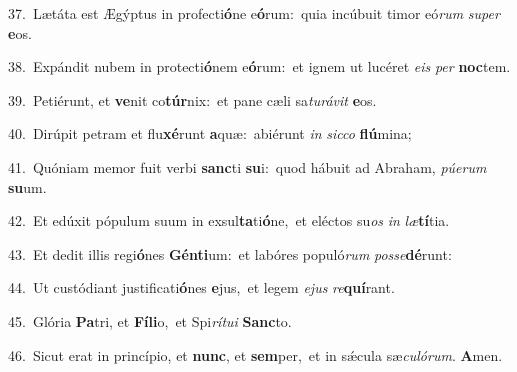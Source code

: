 {\numbfont\textcolor{\numbcolor}{37.}}~Lætáta est Ægýptus in profecti\-\textbf{ó}\-ne e\-\textbf{ó}\-rum:~\star quia incúbuit timor eó\textit{rum} \textit{su}\-\textit{per} \textbf{e}\-os.\par
{\numbfont\textcolor{\numbcolor}{38.}}~Expándit nubem in protecti\-\textbf{ó}\-nem e\-\textbf{ó}\-rum:~\star et ignem ut lucéret \textit{e}\-\textit{is} \textit{per} \textbf{noc}\-tem.\par
{\numbfont\textcolor{\numbcolor}{39.}}~Petiérunt, et \textbf{ve}\-nit co\-\textbf{túr}\-nix:~\star et pane cæli sa\-\textit{tu}\-\textit{rá}\textit{vit} \textbf{e}\-os.\par
{\numbfont\textcolor{\numbcolor}{40.}}~Dirúpit petram et flu\-\textbf{xé}\-runt \textbf{a}\-quæ:~\star abiérunt \textit{in} \textit{sic}\-\textit{co} \textbf{flú}\-mina;\par
{\numbfont\textcolor{\numbcolor}{41.}}~Quóniam memor fuit verbi \textbf{sanc}\-ti \textbf{su}\-i:~\star quod hábuit ad Abraham, \textit{pú}\-\textit{e}\textit{rum} \textbf{su}\-um.\par
{\numbfont\textcolor{\numbcolor}{42.}}~Et edúxit pópulum suum in exsul\-\textbf{ta}\-ti\-\textbf{ó}\-ne,~\star et eléctos su\textit{os} \textit{in} \textit{læ}\-\textbf{tí}tia.\par
{\numbfont\textcolor{\numbcolor}{43.}}~Et dedit illis regi\-\textbf{ó}\-nes \textbf{Gén}\-\textbf{ti}um:~\star et labóres populó\textit{rum} \textit{pos}\-\textit{se}\textbf{dé}runt:\par
{\numbfont\textcolor{\numbcolor}{44.}}~Ut custódiant justificati\-\textbf{ó}\-nes \textbf{e}\-jus,~\star et legem \textit{e}\-\textit{jus} \textit{re}\-\textbf{quí}rant.\par
{\numbfont\textcolor{\numbcolor}{45.}}~Glória \textbf{Pa}\-tri, et \textbf{Fí}\-\textbf{li}o,~\star et Spi\-\textit{rí}\-\textit{tu}\textit{i} \textbf{Sanc}\-to.\par
{\numbfont\textcolor{\numbcolor}{46.}}~Sicut erat in princípio, et \textbf{nunc}\-, et \textbf{sem}\-per,~\star et in sǽcula sæ\-\textit{cu}\-\textit{ló}\textit{rum}. \textbf{A}\-men.\par
